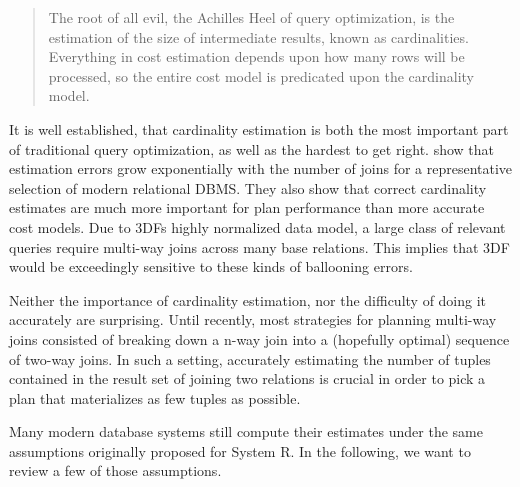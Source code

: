 \documentclass[../index.tex]{subfiles}
\begin{document}
\begin{quote}
The root of all evil, the Achilles Heel of query optimization, is the
estimation of the size of intermediate results, known as
cardinalities. Everything in cost estimation depends upon how many
rows will be processed, so the entire cost model is predicated upon
the cardinality model.

\cite{lohman2014query}
\end{quote}

It is well established, that cardinality estimation is both the most
important part of traditional query optimization, as well as the
hardest to get right. \cite{leis2015good} show that estimation errors
grow exponentially with the number of joins for a representative
selection of modern relational DBMS. They also show that correct
cardinality estimates are much more important for plan performance
than more accurate cost models. Due to 3DFs highly normalized data
model, a large class of relevant queries require multi-way joins
across many base relations. This implies that 3DF would be exceedingly
sensitive to these kinds of ballooning errors.

Neither the importance of cardinality estimation, nor the difficulty
of doing it accurately are surprising. Until recently, most strategies
for planning multi-way joins consisted of breaking down a n-way join
into a (hopefully optimal) sequence of two-way joins. In such a
setting, accurately estimating the number of tuples contained in the
result set of joining two relations is crucial in order to pick a plan
that materializes as few tuples as possible.

Many modern database systems still compute their estimates under the
same assumptions originally proposed for System R. In the following,
we want to review a few of those assumptions.
\end{document}
